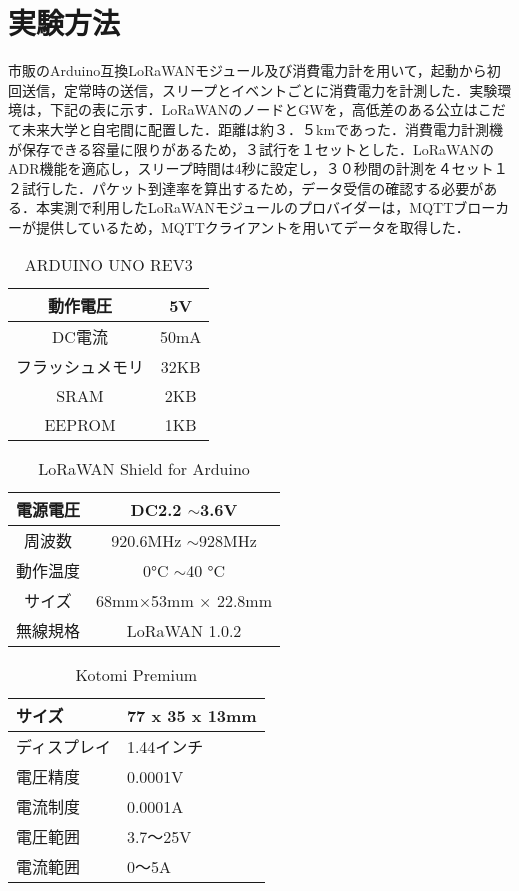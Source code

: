 \section{実験方法}
市販のArduino互換LoRaWANモジュール及び消費電力計を用いて，起動から初回送信，定常時の送信，スリープとイベントごとに消費電力を計測した．実験環境は，下記の表に示す．LoRaWANのノードとGWを，高低差のある公立はこだて未来大学と自宅間に配置した．距離は約３．５kmであった．消費電力計測機が保存できる容量に限りがあるため，３試行を１セットとした．LoRaWANのADR機能を適応し，スリープ時間は4秒に設定し，３０秒間の計測を４セット１２試行した．パケット到達率を算出するため，データ受信の確認する必要がある．本実測で利用したLoRaWANモジュールのプロバイダーは，MQTTブローカーが提供しているため，MQTTクライアントを用いてデータを取得した．

\begin{table}[]
    \caption{ARDUINO UNO REV3}\label{fig:Arduino_Spec}
    \centering
    \begin{tabular}{|c|c|}
    \hline
    動作電圧     & 5V   \\ \hline
    DC電流     & 50mA \\ \hline
    フラッシュメモリ & 32KB \\ \hline
    SRAM     & 2KB  \\ \hline
    EEPROM   & 1KB  \\ \hline
    \end{tabular}
\end{table}

\begin{table}[]
    \caption{LoRaWAN Shield for Arduino}\label{fig:LoRaWAN_Spec}
    \centering
    \begin{tabular}{|c|c|}
    \hline
    電源電圧 & DC2.2 $\sim$3.6V      \\ \hline
    周波数  & 920.6MHz $\sim$928MHz \\ \hline
    動作温度 & 0°C $\sim$40 °C       \\ \hline
    サイズ  & 68mm×53mm × 22.8mm    \\ \hline
    無線規格 & LoRaWAN 1.0.2         \\ \hline
    \end{tabular}
\end{table}

\begin{table}[]
    \caption{Kotomi Premium}\label{fig:Kotomi_Spec}
    \centering
    \begin{tabular}{|l|l|}
    \hline
    サイズ    & 77 x 35 x 13mm \\ \hline
    ディスプレイ & 1.44インチ        \\ \hline
    電圧精度   & 0.0001V        \\ \hline
    電流制度   & 0.0001A        \\ \hline
    電圧範囲   & 3.7～25V        \\ \hline
    電流範囲   & 0～5A           \\ \hline
    \end{tabular}
\end{table}

